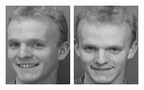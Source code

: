 \begin{figure}[ht]
 \includegraphics[width=\columnwidth/11]{ch3/figures/s5_7.png}
 \includegraphics[width=\columnwidth/11]{ch3/figures/s5_8.png}

\end{figure}
